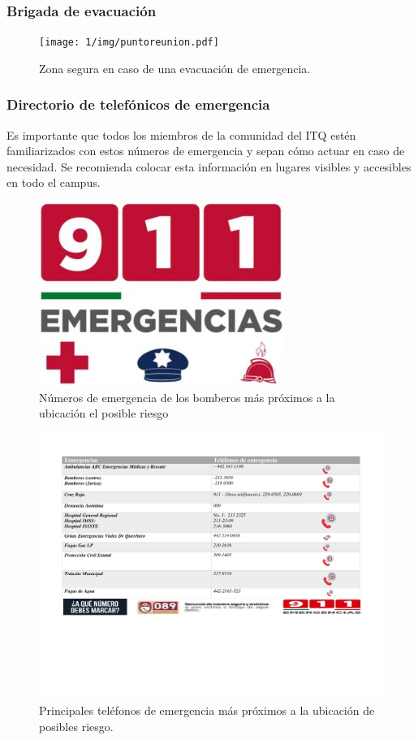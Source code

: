     \subsubsection{Brigada de evacuación}
    
    \begin{figure}[H]
        \centering
        \texttt{[image: 1/img/puntoreunion.pdf]}
        \caption{Zona segura en caso de una evacuación de emergencia. }
        \label{fig:Puntoreunion}
    \end{figure}
    \subsubsection{Directorio de telefónicos de emergencia}
    Es importante que todos los miembros de la comunidad del ITQ estén familiarizados con estos números de emergencia y sepan cómo actuar en caso de necesidad. Se recomienda colocar esta información en lugares visibles y accesibles en todo el campus.
    \begin{figure}[H]
        \centering
        \includegraphics[scale=0.70]{1/img/emergencias.jpg}
        \caption{Números de emergencia de los bomberos más próximos a la ubicación el posible riesgo}
        \label{fig:emergencias}
    \end{figure}
    \begin{figure}[H]
        \centering
        \includegraphics[trim = {20mm 20mm 10mm 10mm},clip,scale=0.30]{1/img/directorio.pdf}
        \caption{Principales teléfonos de emergencia más próximos a la ubicación de posibles riesgo.}
        \label{fig:directorio}
    \end{figure}
